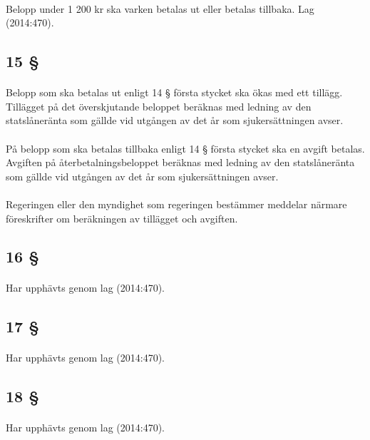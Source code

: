 \documentclass[a4paper,notitlepage,openany,10pt]{book}
\begin{document}
\paragraph*{}
Belopp under 1 200 kr ska varken betalas ut eller betalas tillbaka.
Lag (2014:470).
\subsection*{15 §}
\paragraph*{}
Belopp som ska betalas ut enligt 14 § första stycket ska ökas med ett tillägg. Tillägget på det överskjutande beloppet beräknas med ledning av den statslåneränta som gällde vid utgången av det år som sjukersättningen avser.
\paragraph*{}
På belopp som ska betalas tillbaka enligt 14 § första stycket ska en avgift betalas. Avgiften på återbetalningsbeloppet beräknas med ledning av den statslåneränta som gällde vid utgången av det år som sjukersättningen avser.
\paragraph*{}
Regeringen eller den myndighet som regeringen bestämmer meddelar närmare föreskrifter om beräkningen av tillägget och avgiften.
\subsection*{16 §}
\paragraph*{}
Har upphävts genom
lag (2014:470).
\subsection*{17 §}
\paragraph*{}
Har upphävts genom
lag (2014:470).
\subsection*{18 §}
\paragraph*{}
Har upphävts genom
lag (2014:470).
\end{document}
